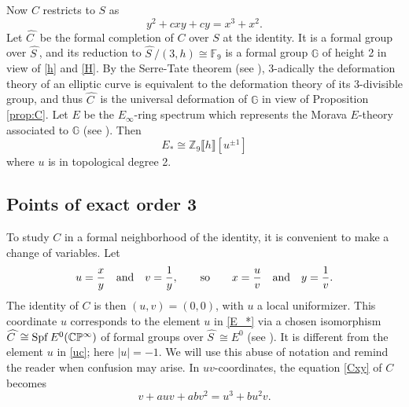 \documentclass{gtpart}
\theoremstyle{definition}
\theoremstyle{remark}
\newcommand{\mb}[1]{\mathbb{#1}}
\newcommand{\Spf}{{\rm Spf\thinspace}}
\newcommand{\BC}{{\mb C}}
\newcommand{\BF}{{\mb F}}
\newcommand{\BG}{{\mb G}}
\newcommand{\BP}{{\mb P}}
\newcommand{\BZ}{{\mb Z}}
\newcommand{\HC}{\widehat{C~}\!}
\newcommand{\HS}{\widehat{S~}\!}
\newcommand{\ad}{{\rm and}}
\begin{document}
Now $C$ restricts to $S$ as 
\begin{equation}
\label{Cc}
 y^2 + c x y + c y = x^3 + x^2.  
\end{equation}
Let $\HC$ be the formal completion of $C$ over $S$ at the identity.  It 
is a formal group over $\HS$, and its reduction to 
$\HS / (3,h) \cong \BF_9$ is a formal group $\BG$ of height 2 in view of 
\eqref{h} and \eqref{H}.  By the Serre-Tate theorem (see 
\cite[2.9.1]{KM}), 3-adically the deformation theory of an elliptic 
curve is equivalent to the deformation theory of its 3-divisible group, 
and thus $\HC$ is the universal deformation of $\BG$ in view of 
Proposition \ref{prop:C}.  Let $E$ be the $E_\infty$-ring spectrum which 
represents the Morava $E$-theory associated to $\BG$ (see 
\cite[Corollary 7.6]{GH}).  Then 
\begin{equation}
\label{E_*}
 E_* \cong \BZ_9 \llbracket h \rrbracket [u^{\pm 1}] 
\end{equation}
where $u$ is in topological degree 2.  


\subsection{Points of exact order 3}

To study $C$ in a formal neighborhood of the identity, it is convenient 
to make a change of variables.  Let 
\[
 u = \frac{x}{y} \quad \ad \quad v = \frac{1}{y}, \qquad {\rm so} \qquad x = \frac{u}{v} \quad \ad \quad y = \frac{1}{v}.  
\]
The identity of $C$ is then $(u,v) = (0,0)$, with $u$ a local 
uniformizer.  This coordinate $u$ corresponds to the element $u$ in 
\eqref{E_*} via a chosen isomorphism 
$\HC \cong \Spf E^0(\BC\BP^\infty)$ of formal groups over 
$\HS \cong E^0$ (see \cite[Definition 1.2]{cube}).  It is different 
from the element $u$ in \eqref{uc}; here $|u| = -1$.  We will use this 
abuse of notation and remind the reader when confusion may arise.  In 
$uv$-coordinates, the equation \eqref{Cxy} of $C$ becomes 
\begin{equation}
\label{Cuv}
 v + a u v + a b v^2 = u^3 + b u^2 v.  
\end{equation}
\end{document}
